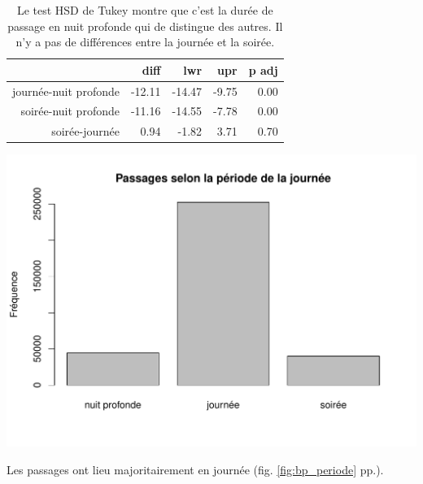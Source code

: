 \documentclass[12pt,english,french,twoside]{book}\usepackage[]{graphicx}\usepackage[]{color}
\makeatletter
\def\maxwidth{ %
  \ifdim\Gin@nat@width>\linewidth
    \linewidth
  \else
    \Gin@nat@width
  \fi
}
\newenvironment{knitrout}{}{} %
\makeatother
\begin{document}
\begin{table}[ht]
\centering
\begin{tabular}{rrrrr}
  \hline
 & diff & lwr & upr & p adj \\ 
  \hline
journée-nuit profonde & -12.11 & -14.47 & -9.75 & 0.00 \\ 
  soirée-nuit profonde & -11.16 & -14.55 & -7.78 & 0.00 \\ 
  soirée-journée & 0.94 & -1.82 & 3.71 & 0.70 \\ 
   \hline
\end{tabular}
\caption{Le test HSD de Tukey montre que c'est la durée de passage en nuit profonde qui de distingue des autres. Il n'y a pas de différences entre la journée et la soirée.} 
\end{table}


\begin{center}
\begin{knitrout}
\color{fgcolor}
\includegraphics[width=\maxwidth]{figure/bp_periode-1} 

\end{knitrout}
 \label{fig:bp_periode}
\end{center}

Les passages ont lieu majoritairement en journée (fig. \ref{fig:bp_periode} pp.\pageref{fig:bp_periode}).
\end{document}
